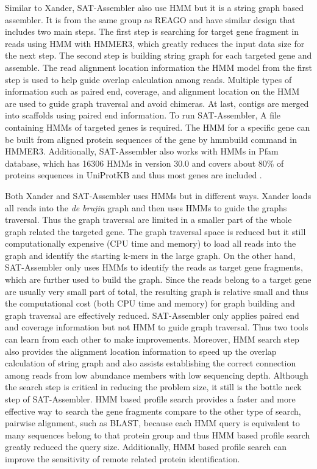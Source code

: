 \documentclass[]{msu-thesis}
\begin{document}
Similar to Xander, SAT-Assembler also use HMM but it is a string graph based assembler. It is from the same group as REAGO and have similar design that includes two main steps. The first step is searching for target gene fragment in reads using HMM with HMMER3, which greatly reduces the input data size for the next step. The second step is building string graph for each targeted gene and assemble. The read alignment location information the HMM model from the first step is used to help guide overlap calculation among reads. Multiple types of information such as paired end, coverage, and alignment location on the HMM are used to guide graph traversal and avoid chimeras. At last, contigs are merged into scaffolds using paired end information. 
To run SAT-Assembler, A file containing HMMs of targeted genes is required. The HMM for a specific gene can be built from aligned protein sequences of the gene by hmmbuild command in HMMER3. Additionally, SAT-Assembler also works with HMMs in Pfam database, which has 16306 HMMs in version 30.0 and covers about 80\% of proteins sequences in UniProtKB and thus most genes are included \cite{finn_pfam_2016}.

Both Xander and SAT-Assembler uses HMMs but in different ways. Xander loads all reads into the \textit{de brujin} graph and then uses HMMs to guide the graphs traversal. Thus the graph traversal are limited in a smaller part of the whole graph related the targeted gene. The graph traversal space is reduced but it still computationally expensive (CPU time and memory) to load all reads into the graph and identify the starting k-mers in the large graph. 
On the other hand, SAT-Assembler only uses HMMs to identify the reads as target gene fragments, which are further used to build the graph. Since the reads belong to a target gene are usually very small part of total, the resulting graph is relative small and thus the computational cost (both CPU time and memory) for graph building and graph traversal are effectively reduced. SAT-Assembler only applies paired end and coverage information but not HMM to guide graph traversal. Thus two tools can learn from each other to make improvements.
Moreover, HMM search step also provides the alignment location information to speed up the overlap calculation of string graph and also assists establishing the correct connection among reads from low abundance members with low sequencing depth.
Although the search step is critical in reducing the problem size, it still is the bottle neck step of SAT-Assembler. HMM based profile search provides a faster and more effective way to search the gene fragments compare to the other type of search, pairwise alignment, such as BLAST, because each HMM query is equivalent to many sequences belong to that protein group and thus HMM based profile search greatly reduced the query size. Additionally, HMM based profile search can improve the sensitivity of remote related protein identification.
\end{document}
